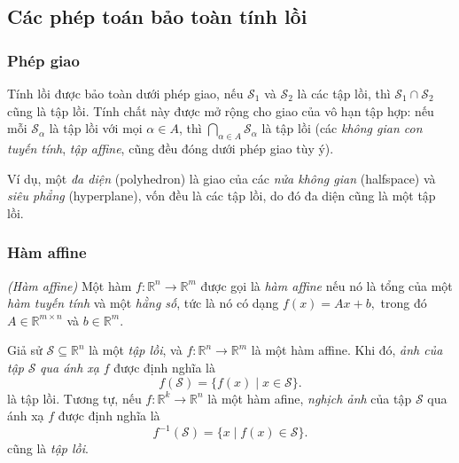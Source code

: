 \subsection{Các phép toán bảo toàn tính lồi}

\subsubsection{Phép giao}

Tính lồi được bảo toàn dưới phép giao, nếu \(\mathcal{S}_1\) và \(\mathcal{S}_2\) là các tập lồi, thì \(\mathcal{S}_1 \cap \mathcal{S}_2\) cũng là tập lồi. Tính chất này được mở rộng cho giao của vô hạn tập hợp:
nếu mỗi \(\mathcal{S}_\alpha\) là tập lồi với mọi \(\alpha \in A\), thì
\( \bigcap_{\alpha \in A} \mathcal{S}_\alpha \) là tập lồi (các \textit{không gian con tuyến tính}, \textit{tập affine}, cũng đều đóng dưới phép giao tùy ý).

\noindent Ví dụ, một \textit{đa diện} (polyhedron) là giao của các \textit{nửa không gian} (halfspace) và \textit{siêu phẳng} (hyperplane), vốn đều là các tập lồi, do đó đa diện cũng là một tập lồi.

\subsubsection{Hàm affine}

\begin{define}\textit{(Hàm affine)}
    \label{define:affine_func}
    Một hàm \( f : \mathbb{R}^n \to \mathbb{R}^m \) được gọi là 
    \textit{hàm affine} nếu nó là tổng của một \textit{hàm tuyến tính} và một \textit{hằng số}, tức là nó có dạng \( f(x) = A x + b, \) trong đó \(A \in \mathbb{R}^{m \times n}\) và \(b \in \mathbb{R}^m\).
\end{define}

\noindent Giả sử \(\mathcal{S} \subseteq \mathbb{R}^n\) là một \textit{tập lồi}, và \(f : \mathbb{R}^n \to \mathbb{R}^m\) là một hàm affine. Khi đó, \textit{ảnh của tập} \(\mathcal{S}\) \textit{qua ánh xạ} \(f\) được định nghĩa là
\[
f(\mathcal{S}) = \{ f(x) \mid x \in \mathcal{S} \}.
\]
là tập lồi. Tương tự, nếu \(f : \mathbb{R}^k \to \mathbb{R}^n\) là một hàm afine, \textit{nghịch ảnh} của tập \(\mathcal{S}\) qua ánh xạ \(f\) được định nghĩa là
\[
f^{-1}(\mathcal{S}) = \{ x \mid f(x) \in \mathcal{S} \}.
\]
cũng là \textit{tập lồi}.